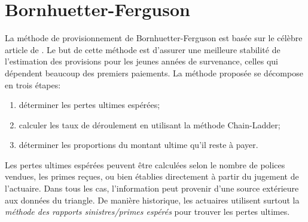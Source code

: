 \section{Bornhuetter-Ferguson}
\label{sec:deterministe:BF}

La méthode de provisionnement de Bornhuetter-Ferguson est basée sur le
célèbre article de \citet{Bornhuetter}. Le but de cette méthode
est d'assurer une meilleure stabilité de l'estimation des provisions
pour les jeunes années de survenance, celles qui dépendent beaucoup des
premiers paiements. La méthode proposée se décompose en trois étapes:
\begin{enumerate}
\item déterminer les pertes ultimes espérées;
\item calculer les taux de déroulement en utilisant la méthode
  Chain-Ladder;
\item déterminer les proportions du montant ultime qu'il reste à
  payer.
\end{enumerate}

Les pertes ultimes espérées peuvent être calculées selon le nombre de
polices vendues, les primes reçues, ou bien établies directement à
partir du jugement de l'actuaire. Dans tous les cas, l'information
peut provenir d'une source extérieure aux données du triangle. De
manière historique, les actuaires utilisent surtout la \textit{méthode
  des rapports sinistres/primes espérés} pour trouver les pertes
ultimes.

